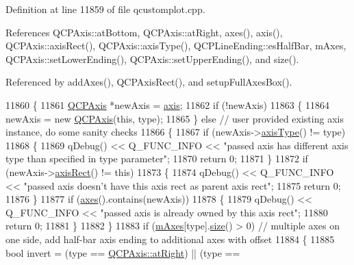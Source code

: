 Definition at line 11859 of file qcustomplot.\+cpp.



References Q\+C\+P\+Axis\+::at\+Bottom, Q\+C\+P\+Axis\+::at\+Right, axes(), axis(), Q\+C\+P\+Axis\+::axis\+Rect(), Q\+C\+P\+Axis\+::axis\+Type(), Q\+C\+P\+Line\+Ending\+::es\+Half\+Bar, m\+Axes, Q\+C\+P\+Axis\+::set\+Lower\+Ending(), Q\+C\+P\+Axis\+::set\+Upper\+Ending(), and size().



Referenced by add\+Axes(), Q\+C\+P\+Axis\+Rect(), and setup\+Full\+Axes\+Box().


\begin{DoxyCode}
11860 \{
11861   \hyperlink{class_q_c_p_axis}{QCPAxis} *newAxis = \hyperlink{class_q_c_p_axis_rect_a560de44e47a4af0f86c59102a094b1e4}{axis};
11862   \textcolor{keywordflow}{if} (!newAxis)
11863   \{
11864     newAxis = \textcolor{keyword}{new} \hyperlink{class_q_c_p_axis}{QCPAxis}(\textcolor{keyword}{this}, type);
11865   \} \textcolor{keywordflow}{else} \textcolor{comment}{// user provided existing axis instance, do some sanity checks}
11866   \{
11867     \textcolor{keywordflow}{if} (newAxis->\hyperlink{class_q_c_p_axis_a593c37bf6aa4990326dc09e24f45db7f}{axisType}() != type)
11868     \{
11869       qDebug() << Q\_FUNC\_INFO << \textcolor{stringliteral}{"passed axis has different axis type than specified in type parameter"};
11870       \textcolor{keywordflow}{return} 0;
11871     \}
11872     \textcolor{keywordflow}{if} (newAxis->\hyperlink{class_q_c_p_axis_aada3102af43b029e3879bcbf2bddfabb}{axisRect}() != \textcolor{keyword}{this})
11873     \{
11874       qDebug() << Q\_FUNC\_INFO << \textcolor{stringliteral}{"passed axis doesn't have this axis rect as parent axis rect"};
11875       \textcolor{keywordflow}{return} 0;
11876     \}
11877     \textcolor{keywordflow}{if} (\hyperlink{class_q_c_p_axis_rect_a18dcdc0dd6c7520bc9f3d15a7a3feec2}{axes}().contains(newAxis))
11878     \{
11879       qDebug() << Q\_FUNC\_INFO << \textcolor{stringliteral}{"passed axis is already owned by this axis rect"};
11880       \textcolor{keywordflow}{return} 0;
11881     \}
11882   \}
11883   \textcolor{keywordflow}{if} (\hyperlink{class_q_c_p_axis_rect_afe7a24d2a2bea98fc552fa826350ba81}{mAxes}[type].\hyperlink{class_q_c_p_axis_rect_a871b9fe49e92b39a3cbe29a59e458536}{size}() > 0) \textcolor{comment}{// multiple axes on one side, add half-bar axis ending to additional
       axes with offset}
11884   \{
11885     \textcolor{keywordtype}{bool} invert = (type == \hyperlink{class_q_c_p_axis_ae2bcc1728b382f10f064612b368bc18aadf5509f7d29199ef2f263b1dd224b345}{QCPAxis::atRight}) || (type == 

\end{DoxyCode}
